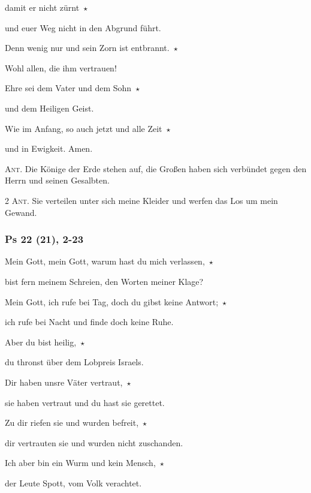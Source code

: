 \noindent damit er nicht zürnt~$\star$~\nopagebreak

und euer Weg nicht in den Abgrund führt. 
 
\noindent Denn wenig nur und sein Zorn ist entbrannt.~$\star$~\nopagebreak

Wohl allen, die ihm vertrauen!

\noindent Ehre sei dem Vater und dem Sohn~$\star$~\nopagebreak

und dem Heiligen Geist.

\noindent Wie im Anfang, so auch jetzt und alle Zeit~$\star$~\nopagebreak

und in Ewigkeit. Amen.

\vspace{10pt}

\noindent \textsc{Ant.} Die Könige der Erde stehen auf, die Großen haben sich verbündet gegen den Herrn und seinen Gesalbten.

\vspace{10pt}


\noindent \textsc{2 Ant.} Sie verteilen unter sich meine Kleider und werfen das Los um mein Gewand.

\subsubsection{Ps 22 (21), 2-23}

\noindent Mein Gott, mein Gott, warum hast du mich verlassen,~$\star$~\nopagebreak

bist fern meinem Schreien, den Worten meiner Klage?
 
\noindent Mein Gott, ich rufe bei Tag, doch du gibst keine Antwort;~$\star$~\nopagebreak

ich rufe bei Nacht und finde doch keine Ruhe.
 
\noindent Aber du bist heilig,~$\star$~\nopagebreak

du thronst über dem Lobpreis Israels.
 
\noindent Dir haben unsre Väter vertraut,~$\star$~\nopagebreak

sie haben vertraut und du hast sie gerettet.
 
\noindent Zu dir riefen sie und wurden befreit,~$\star$~\nopagebreak

dir vertrauten sie und wurden nicht zuschanden.
 
\noindent Ich aber bin ein Wurm und kein Mensch,~$\star$~\nopagebreak

der Leute Spott, vom Volk verachtet.
 
